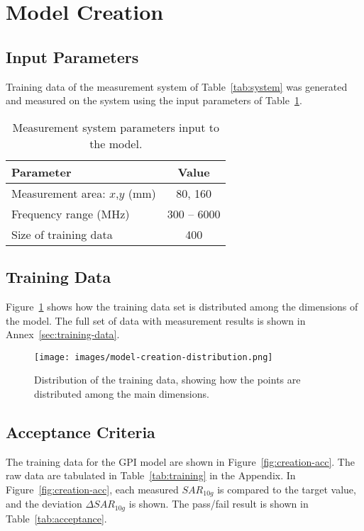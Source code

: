 \documentclass{article}
\begin{document}
\section{Model Creation}

\subsection{Input Parameters}
Training data of the measurement system of Table~\ref{tab:system} was generated and measured on the system using the input parameters of Table~\ref{tab:params}.
\begin{table}[h!]\centering
\begin{tabular}{|l|c|}\hline
\textbf{Parameter} & \textbf{Value} \\\hline
Measurement area: $x$,$y$ (mm) & 80, 160 \\\hline
Frequency range (MHz) & 300 -- 6000 \\\hline
Size of training data & 400 \\\hline
\end{tabular} \caption{Measurement system parameters input to the model.} \label{tab:params}
\end{table}

\FloatBarrier
\subsection{Training Data}

Figure~\ref{fig:training-dist} shows how the training data set is distributed among the dimensions of the model. The full set of data with measurement results is shown in Annex~\ref{sec:training-data}.

\begin{figure} \centering
\texttt{[image: images/model-creation-distribution.png]}
\caption{Distribution of the training data, showing how the points are distributed among the main dimensions.} \label{fig:training-dist}
\end{figure}

\FloatBarrier
\subsection{Acceptance Criteria}
The training data for the GPI model are shown in Figure~\ref{fig:creation-acc}. The raw data are tabulated in Table~\ref{tab:training} in the Appendix.
In Figure~\ref{fig:creation-acc}, each measured $SAR_{10g}$ is compared to the target value, and the deviation $\Delta SAR_{10g}$ is shown. The pass/fail result is shown in Table~\ref{tab:acceptance}.
\end{document}
